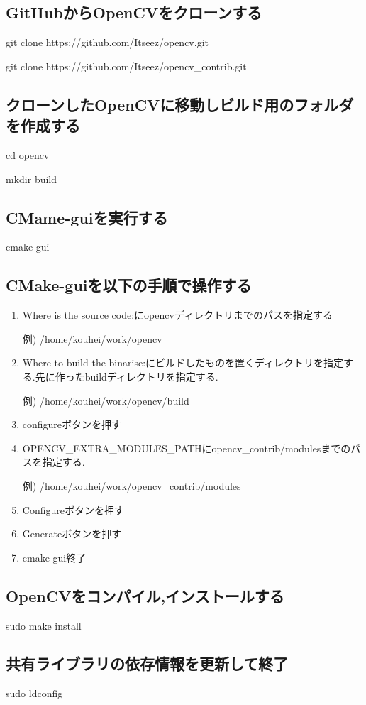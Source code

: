 \documentclass[12pt,oneside]{sotsuken_paper}
\begin{document}
\subsection{GitHubからOpenCVをクローンする}

git clone https://github.com/Itseez/opencv.git

git clone https://github.com/Itseez/opencv\_contrib.git

\subsection{クローンしたOpenCVに移動しビルド用のフォルダを作成する}

cd opencv

mkdir build

\subsection{CMame-guiを実行する}
cmake-gui

\subsection{CMake-guiを以下の手順で操作する}

\begin{enumerate}
\item Where is the source code:にopencvディレクトリまでのパスを指定する

例) /home/kouhei/work/opencv

\item Where to build the binarise:にビルドしたものを置くディレクトリを指定する.先に作ったbuildディレクトリを指定する.

例) /home/kouhei/work/opencv/build

\item configureボタンを押す

\item OPENCV\_EXTRA\_MODULES\_PATHにopencv\_contrib/modulesまでのパスを指定する.

例) /home/kouhei/work/opencv\_contrib/modules

\item Configureボタンを押す

\item Generateボタンを押す

\item cmake-gui終了

\end{enumerate}

\subsection{OpenCVをコンパイル,インストールする}

sudo make install

\subsection{共有ライブラリの依存情報を更新して終了}

sudo ldconfig




\end{document}
